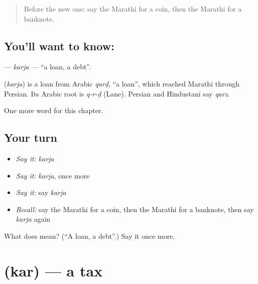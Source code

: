 \label{lesson:MR-C182-karja}



\begin{quote}
Before the new one: say the Marathi for a coin, then the Marathi for a banknote.
\end{quote}

\subsection*{You'll want to know: }
\textbf{} — \emph{karja} — \textquotedblleft{}a loan, a debt\textquotedblright{}.

\begin{cousinweb}
\textbf{} (\emph{karja}) is a loan from Arabic \emph{qarḍ}, \textquotedblleft{}a loan\textquotedblright{}, which reached Marathi through Persian. Its Arabic root is \emph{q-r-ḍ} (Lane). Persian and Hindustani say \emph{qarz}.
\end{cousinweb}

\begin{grammarlens}[title={What you've built}]
One more word for this chapter.
\end{grammarlens}

\subsection*{Your turn}
\begin{itemize}
\raggedright
  \item \emph{Say it:} \emph{karja}
  \item \emph{Say it:} \emph{karja}, once more
  \item \emph{Say it:} say \emph{karja}
  \item \emph{Recall:} say the Marathi for a coin, then the Marathi for a banknote, then say \emph{karja} again
\end{itemize}

\begin{tcolorbox}[breakable,colback=teal!4,colframe=teal!35!black,title={Before you move on}]
What does  mean? (\textquotedblleft{}A loan, a debt\textquotedblright{}.) Say it once more.
\end{tcolorbox}
\section[\texorpdfstring{\mr{कर} (kar)}{कर (kar)}]{ (kar) — a tax}

\label{lesson:MR-C182-kar}



